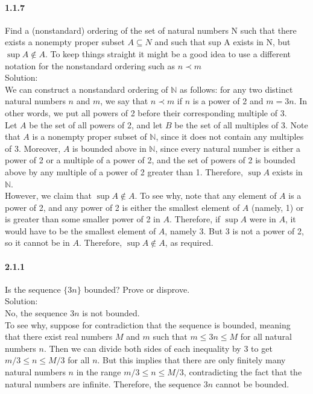 \documentclass{article}
\begin{document}
\paragraph{1.1.7}
Find a (nonstandard) ordering of the set of natural numbers N such that there exists a nonempty proper subset $A \subseteq N$ and such that sup A exists in N, but $\sup A \notin A$. To keep things straight it might be a good idea to use a different notation for the nonstandard ordering such as $n \prec m$\\
Solution:\\
We can construct a nonstandard ordering of $\mathbb{N}$ as follows: for any two distinct natural numbers $n$ and $m$, we say that $n \prec m$ if $n$ is a power of 2 and $m = 3n$. In other words, we put all powers of 2 before their corresponding multiple of 3.\\
Let $A$ be the set of all powers of 2, and let $B$ be the set of all multiples of 3. Note that $A$ is a nonempty proper subset of $\mathbb{N}$, since it does not contain any multiples of 3. Moreover, $A$ is bounded above in $\mathbb{N}$, since every natural number is either a power of 2 or a multiple of a power of 2, and the set of powers of 2 is bounded above by any multiple of a power of 2 greater than 1. Therefore, $\sup A$ exists in $\mathbb{N}$.\\
However, we claim that $\sup A \notin A$. To see why, note that any element of $A$ is a power of 2, and any power of 2 is either the smallest element of $A$ (namely, 1) or is greater than some smaller power of 2 in $A$. Therefore, if $\sup A$ were in $A$, it would have to be the smallest element of $A$, namely 3. But 3 is not a power of 2, so it cannot be in $A$. Therefore, $\sup A \notin A$, as required.
\paragraph{2.1.1}
Is the sequence $\{3n\}$ bounded? Prove or disprove.\\
Solution:\\
No, the sequence ${3n}$ is not bounded.\\
To see why, suppose for contradiction that the sequence is bounded, meaning that there exist real numbers $M$ and $m$ such that $m \leq 3n \leq M$ for all natural numbers $n$. Then we can divide both sides of each inequality by 3 to get $m/3 \leq n \leq M/3$ for all $n$. But this implies that there are only finitely many natural numbers $n$ in the range $m/3 \leq n \leq M/3$, contradicting the fact that the natural numbers are infinite. Therefore, the sequence ${3n}$ cannot be bounded.
\end{document}
